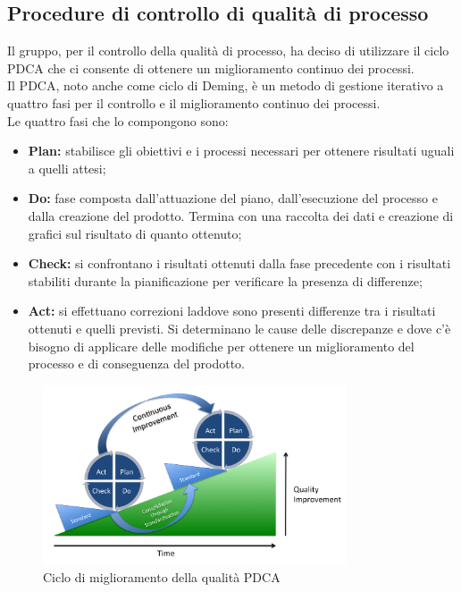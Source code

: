 	\subsection{Procedure di controllo di qualità di processo}
	Il gruppo, per il controllo della qualità di processo, ha deciso di utilizzare il ciclo PDCA che ci consente di ottenere un miglioramento continuo dei processi.\\
	Il PDCA, noto anche come ciclo di Deming, è un metodo di gestione iterativo a quattro fasi per il controllo e il miglioramento continuo dei processi.\\
	Le quattro fasi che lo compongono sono:
		\begin{itemize}
			\item \textbf{Plan:} stabilisce gli obiettivi e i processi necessari per ottenere risultati uguali a quelli attesi;
			\item \textbf{Do:} fase composta dall'attuazione del piano, dall'esecuzione del processo e dalla creazione del prodotto. Termina con una raccolta dei dati e creazione di grafici sul risultato di quanto ottenuto;
			\item \textbf{Check:} si confrontano i risultati ottenuti dalla fase precedente con i risultati stabiliti durante la pianificazione per verificare la presenza di differenze;
			\item \textbf{Act:} si effettuano correzioni laddove sono presenti differenze tra i risultati ottenuti e quelli previsti. Si determinano le cause delle discrepanze e dove c'è bisogno di applicare delle modifiche per ottenere un miglioramento del processo e di conseguenza del prodotto.
		\end{itemize}
		\begin{figure}[h]
			\centering
			\includegraphics[width=90mm]{images/pdca.png}
			\caption{Ciclo di miglioramento della qualità PDCA}
			\label{fig:pdca}
		\end{figure}
	
